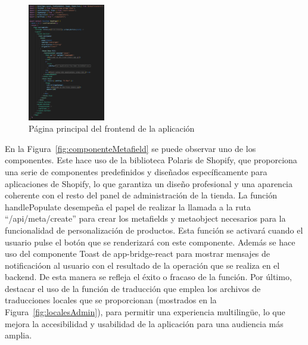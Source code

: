 \documentclass[12pt]{article}
\begin{document}
\begin{figure}[ht]
    \centering
    \includegraphics[width=0.3\textwidth]{imagenes-admin/paginaHome.png}
    \caption{\label{fig:homepage} Página principal del frontend de la aplicación }
    \vspace{\fill}
\end{figure}

En la Figura~\ref{fig:componenteMetafield} se puede observar uno de los componentes. Este hace uso de la biblioteca Polaris de Shopify, que proporciona una serie de componentes predefinidos
y diseñados específicamente para aplicaciones de Shopify, lo que garantiza un diseño profesional y una aparencia coherente con el resto del panel de administración de la tienda.
La función handlePopulate desempeña el papel de realizar la llamada a la ruta ``/api/meta/create'' para crear los metafields y metaobject necesarios para la funcionalidad de personalización de productos.
Esta función se activará cuando el usuario pulse el botón que se renderizará con este componente. Además se hace uso del componente Toast de app-bridge-react para mostrar
mensajes de notificacióon al usuario con el resultado de la operación que se realiza en el backend. De esta manera se refleja el éxito o fracaso de la función. Por último, destacar el uso de la función
de traducción que emplea los archivos de traducciones locales que se proporcionan (mostrados en la Figura~\ref{fig:localesAdmin}), para permitir una experiencia multilingüe, lo que mejora
la accesibilidad y usabilidad de la aplicación para una audiencia más amplia.
\end{document}

